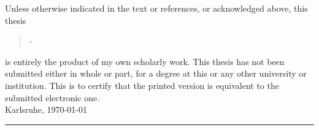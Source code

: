 Unless otherwise indicated in the text or references, or acknowledged above, this thesis 
\begin{quote}
\textit{\titel} -\textit{ \untertitel }
\end{quote}
is entirely the product of my own scholarly work. This thesis has not been submitted either in whole or part, for a degree at this or any other university or institution. This is to certify that the printed version is equivalent to the submitted electronic one.\\[10ex]

Karlsruhe, \today \\[4ex]


\rule[-0.2cm]{5cm}{0.5pt} \\

\textsc{\autor} \\[10ex]

